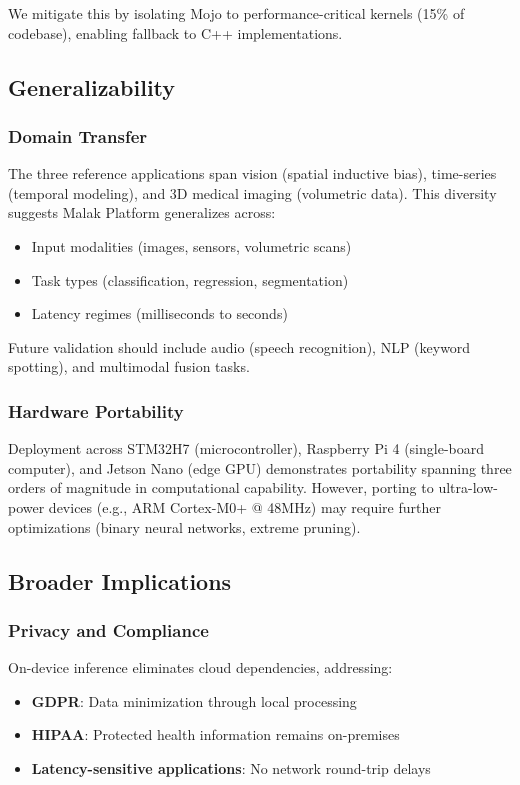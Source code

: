 We mitigate this by isolating Mojo to performance-critical kernels (15\% of codebase), enabling fallback to C++ implementations.

\subsection{Generalizability}

\subsubsection{Domain Transfer}
The three reference applications span vision (spatial inductive bias), time-series (temporal modeling), and 3D medical imaging (volumetric data). This diversity suggests Malak Platform generalizes across:
\begin{itemize}
\item Input modalities (images, sensors, volumetric scans)
\item Task types (classification, regression, segmentation)
\item Latency regimes (milliseconds to seconds)
\end{itemize}

Future validation should include audio (speech recognition), NLP (keyword spotting), and multimodal fusion tasks.

\subsubsection{Hardware Portability}
Deployment across STM32H7 (microcontroller), Raspberry Pi 4 (single-board computer), and Jetson Nano (edge GPU) demonstrates portability spanning three orders of magnitude in computational capability. However, porting to ultra-low-power devices (e.g., ARM Cortex-M0+ @ 48MHz) may require further optimizations (binary neural networks, extreme pruning).

\subsection{Broader Implications}

\subsubsection{Privacy and Compliance}
On-device inference eliminates cloud dependencies, addressing:
\begin{itemize}
\item \textbf{GDPR}: Data minimization through local processing
\item \textbf{HIPAA}: Protected health information remains on-premises
\item \textbf{Latency-sensitive applications}: No network round-trip delays
\end{itemize}

